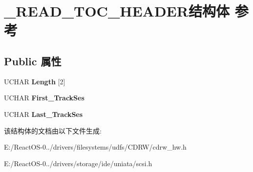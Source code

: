 \hypertarget{struct___r_e_a_d___t_o_c___h_e_a_d_e_r}{}\section{\+\_\+\+R\+E\+A\+D\+\_\+\+T\+O\+C\+\_\+\+H\+E\+A\+D\+E\+R结构体 参考}
\label{struct___r_e_a_d___t_o_c___h_e_a_d_e_r}
\subsection*{Public 属性}
\begin{DoxyCompactItemize}
\item 
\mbox{\label{struct___r_e_a_d___t_o_c___h_e_a_d_e_r_a6efc9154e618cabb99463f6fdc99315b}} 
U\+C\+H\+AR {\bfseries Length} \mbox{[}2\mbox{]}
\item 
\mbox{\label{struct___r_e_a_d___t_o_c___h_e_a_d_e_r_a5f7e32536ddce1155ede3fbdef7c1687}} 
U\+C\+H\+AR {\bfseries First\+\_\+\+Track\+Ses}
\item 
\mbox{\label{struct___r_e_a_d___t_o_c___h_e_a_d_e_r_ad2f9e9a1b1fd80807de46ee7c6219dc5}} 
U\+C\+H\+AR {\bfseries Last\+\_\+\+Track\+Ses}
\end{DoxyCompactItemize}


该结构体的文档由以下文件生成\+:\begin{DoxyCompactItemize}
\item 
E\+:/\+React\+O\+S-\/0../drivers/filesystems/udfs/\+C\+D\+R\+W/cdrw\+\_\+hw.\+h\item 
E\+:/\+React\+O\+S-\/0../drivers/storage/ide/uniata/scsi.\+h\end{DoxyCompactItemize}
